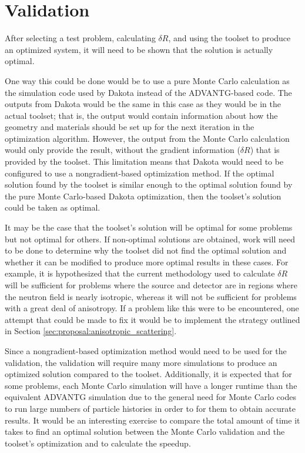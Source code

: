 \section{Validation}
\label{sec:proposal:validation}

After selecting a test problem, calculating $\delta R$, and using the toolset to produce an optimized system, it will need to be shown that the solution is actually optimal.

One way this could be done would be to use a pure Monte Carlo calculation as the simulation code used by Dakota instead of the ADVANTG-based code.
The outputs from Dakota would be the same in this case as they would be in the actual toolset; that is, the output would contain information about how the geometry and materials should be set up for the next iteration in the optimization algorithm.
However, the output from the Monte Carlo calculation would only provide the result, without the gradient information ($\delta R$) that is provided by the toolset.
This limitation means that Dakota would need to be configured to use a nongradient-based optimization method.
If the optimal solution found by the toolset is similar enough to the optimal solution found by the pure Monte Carlo-based Dakota optimization, then the toolset's solution could be taken as optimal.

It may be the case that the toolset's solution will be optimal for some problems but not optimal for others.
If non-optimal solutions are obtained, work will need to be done to determine why the toolset did not find the optimal solution and whether it can be modified to produce more optimal results in these cases.
For example, it is hypothesized that the current methodology used to calculate $\delta R$ will be sufficient for problems where the source and detector are in regions where the neutron field is nearly isotropic, whereas it will not be sufficient for problems with a great deal of anisotropy.
If a problem like this were to be encountered, one attempt that could be made to fix it would be to implement the strategy outlined in Section \ref{sec:proposal:anisotropic_scattering}.

Since a nongradient-based optimization method would need to be used for the validation, the validation will require many more simulations to produce an optimized solution compared to the toolset.
Additionally, it is expected that for some problems, each Monte Carlo simulation will have a longer runtime than the equivalent ADVANTG simulation due to the general need for Monte Carlo codes to run large numbers of particle histories in order to for them to obtain accurate results.
It would be an interesting exercise to compare the total amount of time it takes to find an optimal solution between the Monte Carlo validation and the toolset's optimization and to calculate the speedup.

